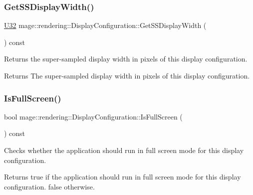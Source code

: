 \subsubsection{\texorpdfstring{Get\+S\+S\+Display\+Width()}{GetSSDisplayWidth()}}
{\footnotesize\ttfamily \mbox{\hyperlink{namespacemage_aa5d6eaabaac3cdd01873d6a3d27e90f3}{U32}} mage\+::rendering\+::\+Display\+Configuration\+::\+Get\+S\+S\+Display\+Width (\begin{DoxyParamCaption}{ }\end{DoxyParamCaption}) const\hspace{0.3cm}{\ttfamily [noexcept]}}

Returns the super-\/sampled display width in pixels of this display configuration.

\begin{DoxyReturn}{Returns}
The super-\/sampled display width in pixels of this display configuration. 
\end{DoxyReturn}
\mbox{\label{classmage_1_1rendering_1_1_display_configuration_a507e755923af2ba1338cc041b5df8e0a}} 
\subsubsection{\texorpdfstring{Is\+Full\+Screen()}{IsFullScreen()}}
{\footnotesize\ttfamily bool mage\+::rendering\+::\+Display\+Configuration\+::\+Is\+Full\+Screen (\begin{DoxyParamCaption}{ }\end{DoxyParamCaption}) const\hspace{0.3cm}{\ttfamily [noexcept]}}

Checks whether the application should run in full screen mode for this display configuration.

\begin{DoxyReturn}{Returns}
{\ttfamily true} if the application should run in full screen mode for this display configuration. {\ttfamily false} otherwise. 
\end{DoxyReturn}
\mbox{\label{classmage_1_1rendering_1_1_display_configuration_a6447404f1d720b98b37f684ba0e790a0}} 
